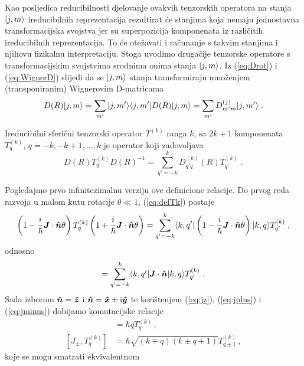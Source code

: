 Kao posljedica reducibilnosti djelovanje ovakvih tenzorskih operatora na 
stanja $| j,m \rangle$ ireducibilnih reprezentacija rezultirat će stanjima
koja nemaju jednostavna transformacijska svojstva jer
su superpozicija komponenata iz različitih ireducibilnih reprezentacija. To će
otežavati i računanje s takvim stanjima i njihovu fizikalnu interpretaciju.
Stoga uvodimo drugačije tenzorske operatore s 
transformacijskim svojstvima srodnima onima stanja $| j,m \rangle$.
Iz (\ref{eq:Drot}) i (\ref{eq:WignerD}) slijedi da se  $| j,m \rangle$
stanja transformiraju množenjem (transponiranim) Wignerovim D-matricama
\begin{equation}
 D(R) | j,m \rangle = \sum_{m'} | j,m' \rangle\langle j,m' |D(R)| j,m \rangle
               = \sum_{m'} D^{(j)}_{m'm}| j,m' \rangle \;.
\end{equation}
\begin{definicija}
Ireducibilni sferični tenzorski operator $T^{(k)}$ ranga $k$, sa
$2k+1$ komponenata $T^{(k)}_q$, $q=-k,-k+1,\ldots,k$ je operator
koji zadovoljava
\begin{equation}
 D(R) T^{(k)}_q D(R)^{-1} = \sum_{q'=-k}^{k} D^{(k)}_{q'q}(R)
      T^{(k)}_{q'} \;.
      \label{eq:defTk}
\end{equation}
\end{definicija}
Pogledajmo prvo infinitezimalnu verziju ove definicione relacije.
Do prvog reda razvoja u malom kutu rotacije $\theta \ll 1$, 
(\ref{eq:defTk}) postaje
\begin{equation}
    \left(1-\frac{i}{\hbar}\vec{J}\cdot\unitn \theta\right)
       T^{(k)}_q
    \left(1+\frac{i}{\hbar}\vec{J}\cdot\unitn \theta\right)
    = \sum_{q'=-k}^{k} \bra{k, q'} 
    \left(1-\frac{i}{\hbar}\vec{J}\cdot\unitn \theta\right)
    \ket{k, q}
      T^{(k)}_{q'} \;,
\end{equation}
odnosno
\begin{equation}
    [\vec{J}\cdot\unitn, T^{(k)}_q] 
    = \sum_{q'=-k}^{k} \bra{k, q'} \vec{J}\cdot\unitn \ket{k, q}
      T^{(k)}_{q'} \;.
\end{equation}
Sada izborom $\unitn = \vec{\hat{z}}$ i
$\unitn = \vec{\hat{x}} \pm \rmi \vec{\hat{y}}$
te korištenjem (\ref{eq:jz}), (\ref{eq:jplus}) i (\ref{eq:jminus}) 
dobijamo komutacijske relacije
\begin{align}
[J_z, T^{(k)}_q ] &= \hbar q T^{(k)}_q \,, \\
[J_\pm, T^{(k)}_q] &= \hbar \sqrt{(k\mp q)(k\pm q +1)} T^{(k)}_{q\pm 1} \,,
\end{align}
koje se mogu smatrati ekvivalentnom
